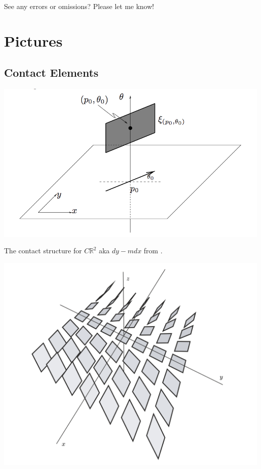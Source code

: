 \documentclass{article}
\theoremstyle{definition}
\begin{document}
See any errors or omissions? Please let me know!

\newpage

\section {Pictures}

\subsection {Contact Elements}

\includegraphics[scale=0.8]{geiges_contact_structure}

The contact structure for $C\mathbb{R}^{2}$ aka $dy - mdx$ from \cite{geiges}.

\includegraphics[scale=0.3]{contact_elements_bachman}
\end{document}
